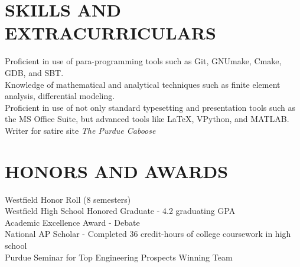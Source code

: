 \documentclass[10pt]{res}
\begin{document}
\begin{resume}
\vspace{-10pt}\section{SKILLS AND EXTRACURRICULARS}          
	Proficient in use of para-programming tools such as Git, GNUmake, Cmake, GDB, and SBT. \\
	Knowledge of mathematical and analytical techniques such as finite element analysis, differential modeling. \\
	Proficient in use of not only standard typesetting and presentation tools such as the MS Office Suite, but advanced tools like \LaTeX, VPython, and MATLAB. \\
	Writer for satire site \emph{The Purdue Caboose}
 
\vspace{-10pt}\section{HONORS AND AWARDS}          
  Westfield Honor Roll (8 semesters) \\
	Westfield High School Honored Graduate - 4.2 graduating GPA \\
	Academic Excellence Award - Debate \\
	National AP Scholar - Completed 36 credit-hours of college coursework in high school \\
	Purdue Seminar for Top Engineering Prospects Winning Team \\
 
 
\end{resume}
\end{document}

